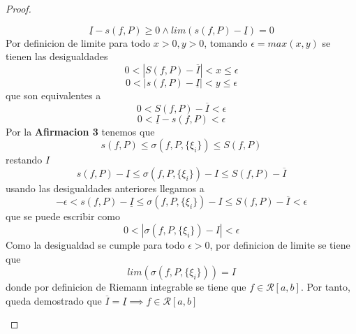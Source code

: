 \documentclass{article}
\begin{document}
\begin{proof}
\begin{enumerate}
\[
\underline{I} - s(f, P) \geq 0 \wedge lim (s(f, P) - \underline{I}) = 0
\]
Por definicion de limite para todo \(x > 0, y > 0\), tomando \(\epsilon = max(x, y)\) se tienen las desigualdades 
\[
0< |S(f, P) - \overline{I} | < x \leq \epsilon
\]
\[
0< |s(f, P) - \underline{I} | < y \leq \epsilon 
\]
que son equivalentes a
\[
0< S(f, P) - \overline{I}  < \epsilon
\]
\[
0<  \underline{I} -  s(f, P)  < \epsilon
\]
Por la \textbf{Afirmacion 3} tenemos que 
\[
s(f, P) \leq \sigma(f, P,\{\xi_i\}) \leq S(f, P)
\]
restando \(I\)
\[
s(f, P) -\underline{I} \leq \sigma(f, P,\{\xi_i\}) - I \leq S(f, P) - \overline{I}
\]
usando las desigualdades anteriores llegamos a 
\[
-\epsilon < s(f, P) -\underline{I} \leq \sigma(f, P,\{\xi_i\}) - I \leq S(f, P) - \overline{I} < \epsilon
\]
que se puede escribir como
\[
0 <|\sigma(f, P,\{\xi_i\}) - I |< \epsilon
\]
Como la desigualdad se cumple para todo \(\epsilon > 0\), por definicion de limite se tiene que 
\[
lim(\sigma(f, P,\{\xi_i\})) = I
\]
donde por definicion de Riemann integrable se tiene que \(f \in \mathcal{R}[a, b]\). Por tanto, queda demostrado que \( \overline{I} = \underline{I} \implies f \in \mathcal{R}[a, b] \)


\end{enumerate}

\end{proof}
\end{document}

